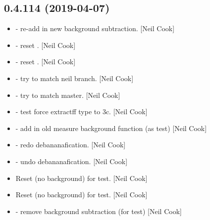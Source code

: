 \documentclass[a4paper,10pt,english]{report}
\begin{document}
\subsection{0.4.114 (2019-04-07)}
\label{\detokenize{misc/changelog:id147}}\begin{itemize}
\item {} 
 - re-add in new background subtraction. {[}Neil
Cook{]}

\item {} 
 - reset . {[}Neil Cook{]}

\item {} 
 - reset . {[}Neil Cook{]}

\item {} 
 - try to match neil branch. {[}Neil Cook{]}

\item {} 
 - try to match master. {[}Neil Cook{]}

\item {} 
 - test force extractff type to 3c. {[}Neil Cook{]}

\item {} 
 - add in old measure background function (as test) {[}Neil
Cook{]}

\item {} 
 - redo debananafication. {[}Neil Cook{]}

\item {} 
 - undo debananafication. {[}Neil Cook{]}

\item {} 
Reset  (no background) for test. {[}Neil Cook{]}

\item {} 
Reset  (no background) for test. {[}Neil Cook{]}

\item {} 
 - remove background subtraction (for test) {[}Neil
Cook{]}

\end{itemize}
\end{document}
